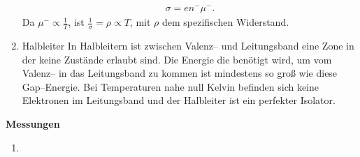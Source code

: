\begin{enumerate}[label=--]
                \begin{align} 
                        \sigma =en^-\mu ^-
                .\end{align} 
                Da $\mu ^-\propto \tfrac{1}{T}$, ist $\tfrac{1}{\sigma }=\rho \propto T$, mit $\rho $ dem spezifischen Widerstand.
        \item Halbleiter \hspace{25pt} 
                In Halbleitern ist zwischen Valenz-- und Leitungsband eine Zone in der keine Zustände erlaubt sind. 
                Die Energie die benötigt wird, um vom Valenz-- in das Leitungsband zu kommen ist mindestens so groß wie diese Gap--Energie.
                Bei Temperaturen nahe null Kelvin befinden sich keine Elektronen im Leitungsband und der Halbleiter ist ein perfekter Isolator.
\end{enumerate}
\textbf{Messungen} 
\begin{enumerate}[label=--]
        \item 
\end{enumerate}

\newpage
